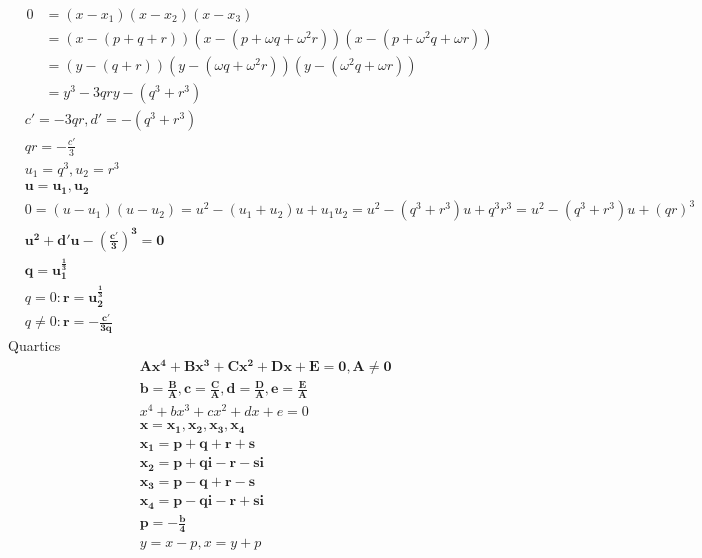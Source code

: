 \documentclass{article}
\begin{document}
\begin{align*}
  0&=(x-x_1)(x-x_2)(x-x_3) \\
  &=(x-(p+q+r))(x-(p+\omega q+\omega^2r))(x-(p+\omega^2q+\omega r)) \\
  &=(y-(q+r))(y-(\omega q+\omega^2r))(y-(\omega^2q+\omega r)) \\
  &=y^3-3qry-(q^3+r^3)
\end{align*}
\begin{align*}
  &c'=-3qr, d'=-(q^3+r^3) \\
  &qr=-\frac{c'}{3} \\
  &u_1=q^3, u_2=r^3 \\
  &\bm{u=u_1, u_2} \\
  &0=(u-u_1)(u-u_2)=u^2-(u_1+u_2)u+u_1u_2=u^2-(q^3+r^3)u+q^3r^3=u^2-(q^3+r^3)u+(qr)^3 \\
  &\bm{u^2+d'u-\left(\frac{c'}{3}\right)^3=0} \\
  &\bm{q=u_1^\frac{1}{3}} \\
  &q=0: \bm{r=u_2^\frac{1}{3}} \\
  &q\neq0: \bm{r=-\frac{c'}{3q}}
\end{align*}
\newpage
Quartics
\begin{align*}  
  &\bm{Ax^4+Bx^3+Cx^2+Dx+E=0, A\neq0} \\
  &\bm{b=\frac{B}{A}, c=\frac{C}{A}, d=\frac{D}{A}, e=\frac{E}{A}} \\
  &x^4+bx^3+cx^2+dx+e=0 \\
  &\bm{x=x_1,x_2,x_3,x_4} \\
  &\bm{x_1=p+q+r+s} \\
  &\bm{x_2=p+qi-r-si} \\
  &\bm{x_3=p-q+r-s} \\
  &\bm{x_4=p-qi-r+si} \\
  &\bm{p=-\frac{b}{4}} \\
  &y=x-p, x=y+p
\end{align*}
\end{document}
